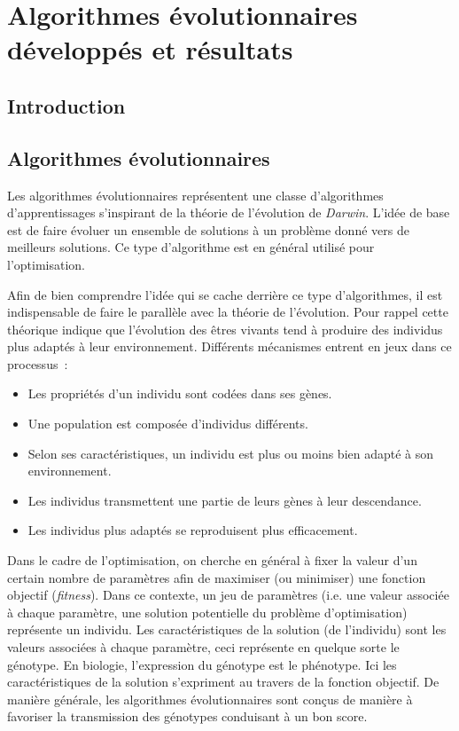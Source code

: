 \documentclass[a4paper, 11pt]{report}
\begin{document}
\chapter{Algorithmes évolutionnaires développés et résultats}
\section{Introduction}

\section{Algorithmes évolutionnaires}
\label{evointro}
Les algorithmes évolutionnaires représentent une classe d'algorithmes d'apprentissages s'inspirant de la théorie de l'évolution de \textit{Darwin}. L'idée de base est de faire évoluer un ensemble de solutions à un problème donné vers de meilleurs solutions. Ce type d'algorithme est en général utilisé pour l'optimisation.

Afin de bien comprendre l'idée qui se cache derrière ce type d'algorithmes, il est indispensable de faire le parallèle avec la théorie de l'évolution. Pour rappel cette théorique indique que l'évolution des êtres vivants tend à produire des individus plus adaptés à leur environnement. Différents mécanismes entrent en jeux dans ce processus~\cite{WIKI_EVO}:
\begin{itemize}
\item Les propriétés d'un individu sont codées dans ses gènes.
\item Une population est composée d'individus différents.
\item Selon ses caractéristiques, un individu est plus ou moins bien adapté à son environnement.
\item Les individus transmettent une partie de leurs gènes à leur descendance.
\item Les individus plus adaptés se reproduisent plus efficacement.
\end{itemize}

Dans le cadre de l'optimisation, on cherche en général à fixer la valeur d'un certain nombre de paramètres afin de maximiser (ou minimiser) une fonction objectif (\textit{fitness}). Dans ce contexte, un jeu de paramètres (i.e. une valeur associée à chaque paramètre, une solution potentielle du problème d'optimisation) représente un individu. Les caractéristiques de la solution (de l'individu) sont les valeurs associées à chaque paramètre, ceci représente en quelque sorte le génotype. En biologie, l'expression du génotype est le phénotype. Ici les caractéristiques de la solution s'expriment au travers de la fonction objectif. De manière générale, les algorithmes évolutionnaires sont conçus de manière à favoriser la transmission des génotypes conduisant à un bon score.  
\end{document}
